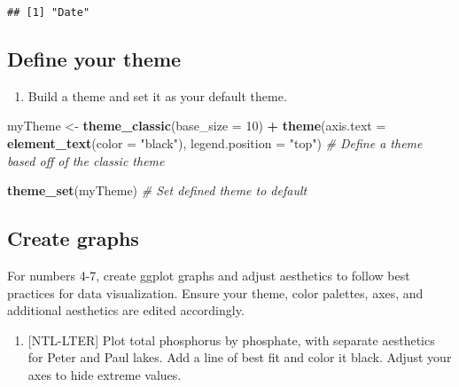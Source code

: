 \documentclass[
]{article}
\newenvironment{Shaded}{\begin{snugshade}}{\end{snugshade}}
\newcommand{\CommentTok}[1]{\textcolor[rgb]{0.56,0.35,0.01}{\textit{#1}}}
\newcommand{\DataTypeTok}[1]{\textcolor[rgb]{0.13,0.29,0.53}{#1}}
\newcommand{\DecValTok}[1]{\textcolor[rgb]{0.00,0.00,0.81}{#1}}
\newcommand{\KeywordTok}[1]{\textcolor[rgb]{0.13,0.29,0.53}{\textbf{#1}}}
\newcommand{\NormalTok}[1]{#1}
\newcommand{\OperatorTok}[1]{\textcolor[rgb]{0.81,0.36,0.00}{\textbf{#1}}}
\newcommand{\StringTok}[1]{\textcolor[rgb]{0.31,0.60,0.02}{#1}}
\providecommand{\tightlist}{%
  \setlength{\itemsep}{0pt}\setlength{\parskip}{0pt}}
\begin{document}
\begin{verbatim}
## [1] "Date"
\end{verbatim}

\hypertarget{define-your-theme}{%
\subsection{Define your theme}\label{define-your-theme}}

\begin{enumerate}
\def\labelenumi{\arabic{enumi}.}
\setcounter{enumi}{2}
\tightlist
\item
  Build a theme and set it as your default theme.
\end{enumerate}

\begin{Shaded}
\begin{Highlighting}[]
\NormalTok{myTheme <-}\StringTok{ }\KeywordTok{theme_classic}\NormalTok{(}\DataTypeTok{base_size =} \DecValTok{10}\NormalTok{) }\OperatorTok{+}
\StringTok{  }\KeywordTok{theme}\NormalTok{(}\DataTypeTok{axis.text =} \KeywordTok{element_text}\NormalTok{(}\DataTypeTok{color =} \StringTok{"black"}\NormalTok{), }
        \DataTypeTok{legend.position =} \StringTok{"top"}\NormalTok{) }\CommentTok{# Define a theme based off of the classic theme}

\KeywordTok{theme_set}\NormalTok{(myTheme) }\CommentTok{# Set defined theme to default}
\end{Highlighting}
\end{Shaded}

\hypertarget{create-graphs}{%
\subsection{Create graphs}\label{create-graphs}}

For numbers 4-7, create ggplot graphs and adjust aesthetics to follow
best practices for data visualization. Ensure your theme, color
palettes, axes, and additional aesthetics are edited accordingly.

\begin{enumerate}
\def\labelenumi{\arabic{enumi}.}
\setcounter{enumi}{3}
\tightlist
\item
  {[}NTL-LTER{]} Plot total phosphorus by phosphate, with separate
  aesthetics for Peter and Paul lakes. Add a line of best fit and color
  it black. Adjust your axes to hide extreme values.
\end{enumerate}
\end{document}
